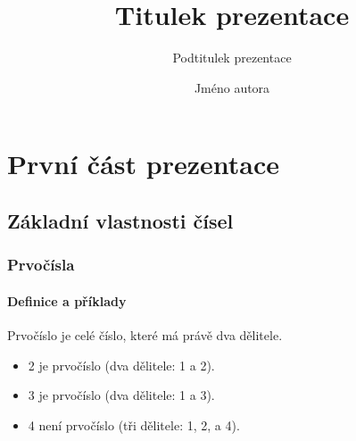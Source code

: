 \documentclass[11pt,twoside]{article}
\title{Titulek prezentace}
\subtitle{Podtitulek prezentace}
\author{Jméno autora}
\begin{document}
    \frame{\maketitle}
    \frame{\tableofcontents}

    \section{První část prezentace}
    \subsection{Základní vlastnosti čísel}
    \begin{frame}
        \frametitle{Prvočísla}
        \framesubtitle{Definice a příklady}
        
        \begin{definition}
            \alert{Prvočíslo} je celé číslo, které má právě dva dělitele.
        \end{definition}
        \begin{example}
            \begin{itemize}
                \item 2 je prvočíslo (dva dělitele: 1 a 2).
                \item 3 je prvočíslo (dva dělitele: 1 a 3).
                \item 4 není prvočíslo (\alert{tři} dělitele: 1, 2, a 4).
            \end{itemize}
        \end{example}
    \end{frame}
\end{document}

